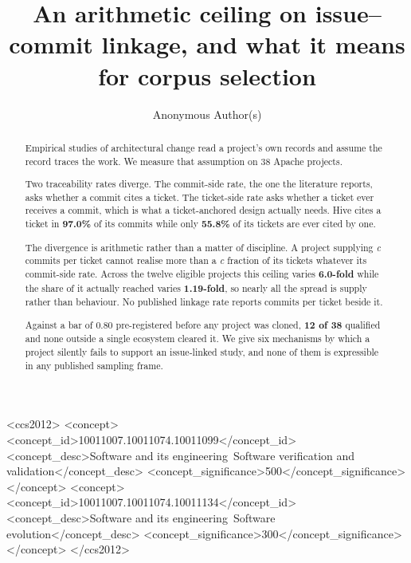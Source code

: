 \documentclass[sigconf,review,anonymous]{acmart}
\title{An arithmetic ceiling on issue--commit linkage, and what it means for corpus selection}
\author{Anonymous Author(s)}
\begin{document}
\begin{abstract}

Empirical studies of architectural change read a project's own records and assume the record traces the work. We measure that assumption on 38 Apache projects.

Two traceability rates diverge. The commit-side rate, the one the literature reports, asks whether a commit cites a ticket. The ticket-side rate asks whether a ticket ever receives a commit, which is what a ticket-anchored design actually needs. Hive cites a ticket in \textbf{97.0\%} of its commits while only \textbf{55.8\%} of its tickets are ever cited by one.

The divergence is arithmetic rather than a matter of discipline. A project supplying \emph{c} commits per ticket cannot realise more than a \emph{c} fraction of its tickets whatever its commit-side rate. Across the twelve eligible projects this ceiling varies \textbf{6.0-fold} while the share of it actually reached varies \textbf{1.19-fold}, so nearly all the spread is supply rather than behaviour. No published linkage rate reports commits per ticket beside it.

Against a bar of 0.80 pre-registered before any project was cloned, \textbf{12 of 38} qualified and none outside a single ecosystem cleared it. We give six mechanisms by which a project silently fails to support an issue-linked study, and none of them is expressible in any published sampling frame.


\end{abstract}


\begin{CCSXML}
<ccs2012>
<concept>
<concept_id>10011007.10011074.10011099</concept_id>
<concept_desc>Software and its engineering~Software verification and
validation</concept_desc>
<concept_significance>500</concept_significance>
</concept>
<concept>
<concept_id>10011007.10011074.10011134</concept_id>
<concept_desc>Software and its engineering~Software evolution</concept_desc>
<concept_significance>300</concept_significance>
</concept>
</ccs2012>
\end{CCSXML}



\maketitle
\end{document}
